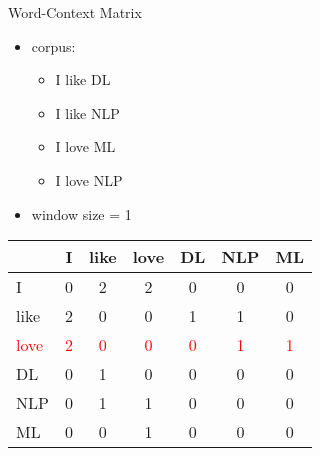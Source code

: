\begin{frame}{Word-Context Matrix}
\begin{itemize}
    \item corpus:
\begin{itemize}
    \item I like DL
    \item I like NLP
    \item I love ML
    \item I love NLP
\end{itemize}
\item window size = 1

\end{itemize}
{
\begin{table}[!h]
    \centering
    \begin{tabular}{l|cccccc}
          &  I & like & love & DL & NLP &ML  \\
          \hline
         I & 0 & 2 & 2 & 0 &0 &0  \\
         \textcolor{myblue}{like} & \textcolor{myblue}{2} & \textcolor{myblue}{0} & \textcolor{myblue}{0} & \textcolor{myblue}{1} & \textcolor{myblue}{1} & \textcolor{myblue}{0} \\
         \textcolor{red}{love} & \textcolor{red}{2} & \textcolor{red}{0} & \textcolor{red}{0} & \textcolor{red}{0} & \textcolor{red}{1} & \textcolor{red}{1} \\
         DL & 0 & 1 & 0 & 0 & 0 & 0 \\
         NLP & 0 & 1 & 1 & 0 & 0  & 0\\
         ML & 0 & 0 & 1 & 0 & 0 & 0\\
         \hline
    \end{tabular}
\end{table}
}
\end{frame}


